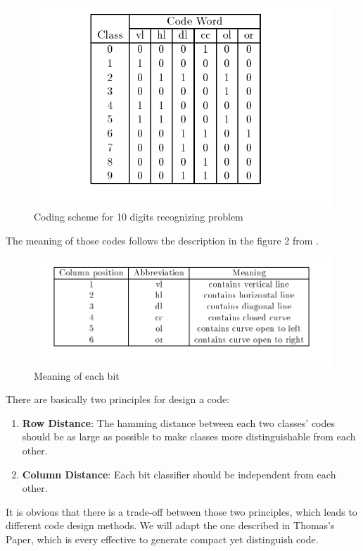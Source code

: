 \begin{figure}[!htbp]
\centering
\includegraphics[bb=0 0 680 500,scale=.3]{FIG/code.png} 
\caption{Coding scheme for 10 digits recognizing problem}
\end{figure}

The meaning of those codes follows the description in the figure 2 from \cite{Thomas1995}.


\begin{figure}[!htbp]
\centering
\includegraphics[bb=0 0 860 300,scale=.3]{FIG/meaning.png} 
\caption{Meaning of each bit}
\end{figure}
 
There are basically two principles for design a code\cite{Thomas1995}:
\begin{enumerate}
	\item \textbf{Row Distance}: The hamming distance between each two classes' codes should be as large as possible to make classes more distinguishable from each other.
	\item \textbf{Column Distance}: Each bit classifier should be independent from each other.
\end{enumerate}  

It is obvious that there is a trade-off between those two principles, which leads to different code design methods. We will adapt the one described in Thomas's Paper\cite{Thomas1995}, which is every effective to generate compact yet distinguish code. 

